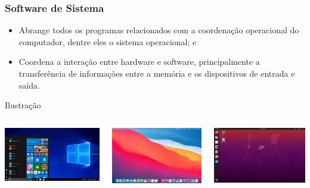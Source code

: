 \documentclass[aspectratio=169]{beamer} %
\begin{document}
\begin{frame}
	\frametitle{Software de Sistema}
		
	\begin{itemize}
		\item Abrange todos os programas relacionados com a coordenação operacional do computador, dentre eles o sistema operacional; e
		\item Coordena a interação entre hardware e software, principalmente a transferência de informações entre a memória e os dispositivos de entrada e saída.
	\end{itemize}\vfill
	
	\begin{exampleblock}{Ilustra\c cão}
		\begin{columns}[c]
				\includegraphics[scale=0.4]{img/windows}
		
				\includegraphics[scale=0.4]{img/macos}
			
				\includegraphics[scale=0.4]{img/ubuntu}
		\end{columns}
	\end{exampleblock}
\end{frame}
\end{document}
